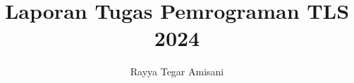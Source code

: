 \documentclass{article}
\begin{document}
    \title{Laporan Tugas Pemrograman TLS 2024}
    \author{Rayya Tegar Amisani}
\end{document}
